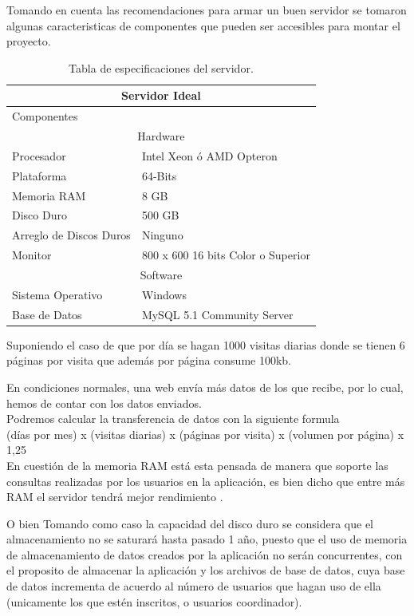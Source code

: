 	Tomando en cuenta las recomendaciones para armar un buen servidor se tomaron algunas caracteristicas de componentes que pueden ser accesibles para montar el proyecto. \cite{serv}\cite{servi}
	\begin{table}[htbp]
		\begin{center}
			\begin{tabular}{|l|l|}
				\hline
				\multicolumn{2}{|c|}{Servidor Ideal} \\
				\hline
				Componentes & \\
				\hline
				\multicolumn{2}{|c|}{Hardware} \\
				\hline
				Procesador & Intel Xeon ó AMD Opteron\\
				\hline
				Plataforma & 64-Bits\\
				\hline
				Memoria RAM & 8 GB\\
				\hline
				Disco Duro & 500 GB\\
				\hline
				Arreglo de Discos Duros & Ninguno\\
				\hline
				Monitor & 800 x 600 16 bits Color o Superior\\
				\hline
				\multicolumn{2}{|c|}{Software} \\
				\hline
				Sistema Operativo & Windows \\
				\hline
				Base de Datos & MySQL 5.1 Community Server\\
				\hline
			\end{tabular}
			\caption{Tabla de especificaciones del servidor.}
		\end{center}
	\end{table}
Suponiendo el caso de que por día se hagan 1000 visitas diarias donde se tienen 6 páginas por visita que además por página consume 100kb.

En condiciones normales, una web envía más datos de los que recibe, por lo cual, hemos de contar con los datos enviados.
\\
Podremos calcular la transferencia de datos con la siguiente formula\\

(días por mes) x (visitas diarias) x (páginas por visita) x (volumen por página) x 1,25\\

En cuestión de la memoria RAM está esta pensada de manera que soporte las consultas realizadas por los usuarios en la aplicación, es bien dicho que entre más RAM el servidor tendrá mejor rendimiento \cite{servi}.

O bien Tomando como caso la capacidad del disco duro se considera que el almacenamiento no se saturará hasta pasado 1 año, puesto que el uso de memoria de almacenamiento de datos creados por la aplicación no serán concurrentes, con el proposito de almacenar la aplicación y los archivos de base de datos, cuya base de datos incrementa de acuerdo al número de usuarios que hagan uso de ella (unicamente los que estén inscritos, o usuarios coordinador).\\



